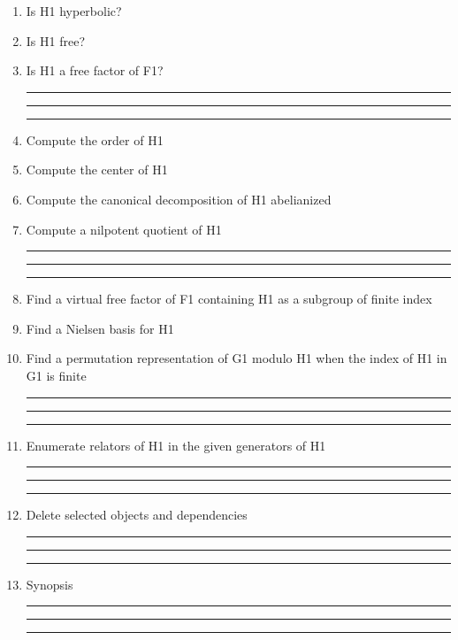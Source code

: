\begin{enumerate}
\item Is H1 hyperbolic?

\item Is H1 free?

\item Is H1 a free factor of F1?

\bigskip
\hrule\hrule\hrule


\item Compute the order of H1

\item Compute the center of H1

\item Compute the canonical decomposition of H1 abelianized

\item Compute a nilpotent quotient of H1

\bigskip
\hrule\hrule\hrule

\item Find a virtual free factor of F1 containing H1 as a subgroup
of finite index

\item Find a  Nielsen basis for H1

\item Find a permutation representation of G1 modulo H1 when the index
of H1 in G1 is finite

\bigskip
\hrule\hrule\hrule

\item Enumerate relators of H1 in the given generators
of H1

\bigskip
\hrule\hrule\hrule

\item Delete selected objects and dependencies

\bigskip
\hrule\hrule\hrule

\item
Synopsis

\bigskip
\hrule\hrule\hrule

\end{enumerate}
